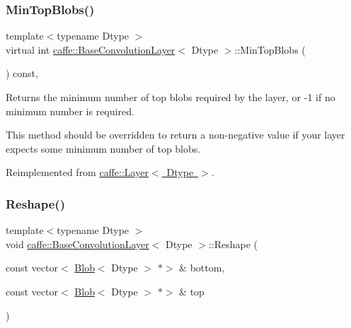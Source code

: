 \subsubsection{\texorpdfstring{Min\+Top\+Blobs()}{MinTopBlobs()}\hspace{0.1cm}{\footnotesize\ttfamily [2/2]}}
{\footnotesize\ttfamily template$<$typename Dtype $>$ \\
virtual int \mbox{\hyperlink{classcaffe_1_1_base_convolution_layer}{caffe\+::\+Base\+Convolution\+Layer}}$<$ Dtype $>$\+::Min\+Top\+Blobs (\begin{DoxyParamCaption}{ }\end{DoxyParamCaption}) const\hspace{0.3cm}{\ttfamily [inline]}, {\ttfamily [virtual]}}



Returns the minimum number of top blobs required by the layer, or -\/1 if no minimum number is required. 

This method should be overridden to return a non-\/negative value if your layer expects some minimum number of top blobs. 

Reimplemented from \mbox{\hyperlink{classcaffe_1_1_layer_ab9e4c8d642e413948b131d851a8462a4}{caffe\+::\+Layer$<$ Dtype $>$}}.

\mbox{\label{classcaffe_1_1_base_convolution_layer_aa215338f200c832081f2719a54bc5256}} 
\subsubsection{\texorpdfstring{Reshape()}{Reshape()}\hspace{0.1cm}{\footnotesize\ttfamily [1/2]}}
{\footnotesize\ttfamily template$<$typename Dtype $>$ \\
void \mbox{\hyperlink{classcaffe_1_1_base_convolution_layer}{caffe\+::\+Base\+Convolution\+Layer}}$<$ Dtype $>$\+::Reshape (\begin{DoxyParamCaption}\item[{const vector$<$ \mbox{\hyperlink{classcaffe_1_1_blob}{Blob}}$<$ Dtype $>$ $\ast$$>$ \&}]{bottom,  }\item[{const vector$<$ \mbox{\hyperlink{classcaffe_1_1_blob}{Blob}}$<$ Dtype $>$ $\ast$$>$ \&}]{top }\end{DoxyParamCaption})\hspace{0.3cm}{\ttfamily [virtual]}}



